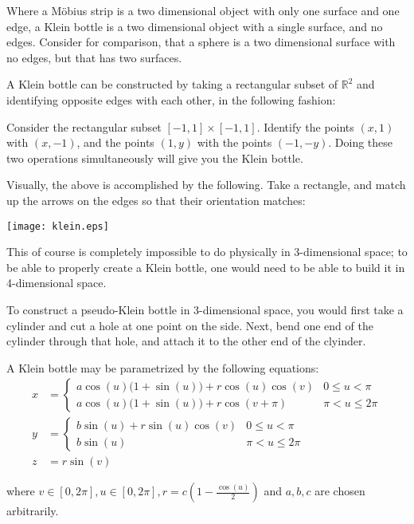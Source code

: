 \documentclass[12pt]{article}
\begin{document}
Where a M\"obius strip is a two dimensional object with only one surface and one edge, a Klein bottle is a two dimensional object with a single surface, and no edges. Consider for comparison, that a sphere is a two dimensional surface with no edges, but that has two surfaces.

A Klein bottle can be constructed by taking a rectangular subset of $\mathbb{R}^2$ and identifying opposite edges with each other, in the following fashion:

Consider the rectangular subset $[-1,1] \times [-1,1]$. Identify the points $(x, 1)$ with $(x, -1)$, and the points $(1,y)$ with the points $(-1,-y)$. Doing these two operations simultaneously will give you the Klein bottle.

Visually, the above is accomplished by the following. Take a rectangle, and match up the arrows on the edges so that their orientation matches:

\begin{center}
\texttt{[image: klein.eps]}
\end{center}

This of course is completely impossible to do physically in 3-dimensional space; to be able to properly create a Klein bottle, one would need to be able to build it in 4-dimensional space.

To construct a pseudo-Klein bottle in 3-dimensional space, you would first take a cylinder and cut a hole at one point on the side. Next, bend one end of the cylinder through that hole, and attach it to the other end of the clyinder.

A Klein bottle may be parametrized by the following equations:
\begin{align*}
x &= \begin{cases}
a\cos(u)\bigl(1+\sin(u)\bigr) + r\cos(u)\cos(v) & 0 \le u < \pi\\
a\cos(u)\bigl(1+\sin(u)\bigr) + r\cos(v + \pi) & \pi < u \le 2\pi
\end{cases}\\
y &=\begin{cases}
b\sin(u) + r\sin(u)\cos(v) & 0 \le u < \pi\\
b\sin(u) & \pi < u \le 2\pi
\end{cases}\\
z &= r\sin(v)
\end{align*}

where $v\in [0,2\pi], u \in [0, 2\pi], r = c(1-\frac{\cos(u)}{2})$ and $a, b, c$ are chosen arbitrarily.
\end{document}
